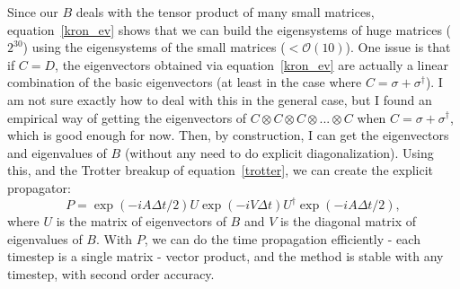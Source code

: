 \documentclass{article}
\begin{document}
Since our $B$ deals with the tensor product of many small matrices,
equation~\ref{kron_ev} shows that we can build the eigensystems
of huge matrices ($2^{30}$) using the eigensystems of the small matrices ($<\mathcal{O}
(10)$). One issue is that if $C = D$, the eigenvectors obtained via
equation~\ref{kron_ev} are actually a linear combination of the basic
eigenvectors (at least in the case where $C = \sigma + \sigma^\dagger$). I am
not sure exactly how to deal with this in the general case, but I found an
empirical way of getting the eigenvectors of $C \otimes C \otimes C \otimes ...
\otimes C$ when $C = \sigma + \sigma^\dagger$, which is good enough for now.
Then, by construction, I can get the eigenvectors and eigenvalues of $B$
(without any need to do explicit diagonalization). Using this, and the Trotter
breakup of equation~\ref{trotter}, we can create the explicit propagator:
\begin{equation}\label{propagator}
  P = \exp(-i A \Delta t/2) U \exp(-i V \Delta t) U^\dagger \exp(-i A \Delta t/2),
\end{equation}
where $U$ is the matrix of eigenvectors of $B$ and $V$ is the diagonal matrix of
eigenvalues of $B$. With $P$, we can do the time propagation efficiently - each
timestep is a single matrix - vector product, and the method is stable with any
timestep, with second order accuracy.
\end{document}
